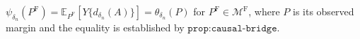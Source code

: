 \(\psi_{\delta_n}(P^{\mathrm F})=\mathbb E_{P^{\mathrm F}}[Y\{d_{\delta_n}(A)\}]=\theta_{\delta_n}(P)\) for \(P^{\mathrm F}\in\mathcal M^{\mathrm F}\), where \(P\) is its observed margin and the equality is established by \(\texttt{prop:causal-bridge}\).